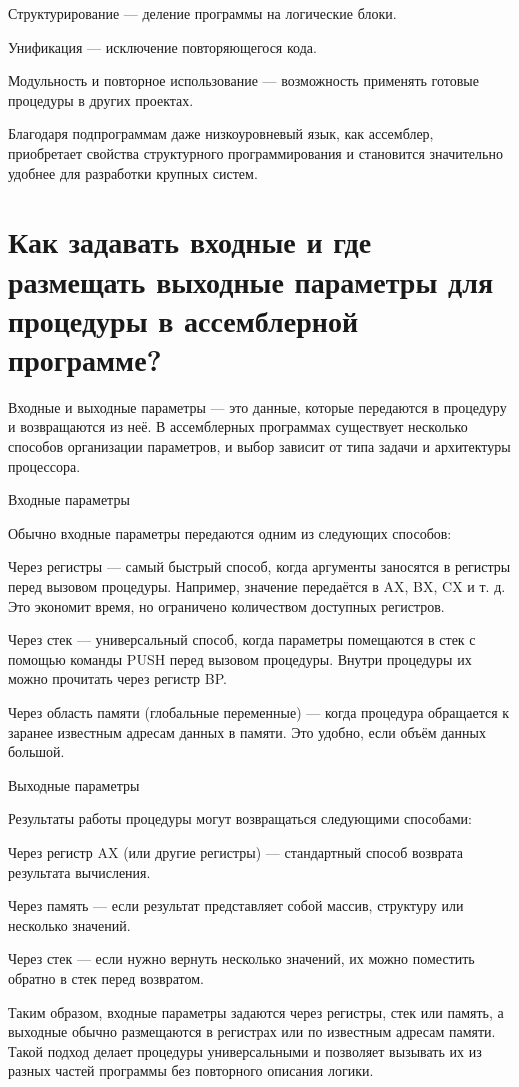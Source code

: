Структурирование — деление программы на логические блоки.

Унификация — исключение повторяющегося кода.

Модульность и повторное использование — возможность применять готовые процедуры в других проектах.

Благодаря подпрограммам даже низкоуровневый язык, как ассемблер, приобретает свойства структурного программирования и становится значительно удобнее для разработки крупных систем.

\section{Как задавать входные и где размещать выходные параметры для процедуры в ассемблерной программе?}

Входные и выходные параметры — это данные, которые передаются в процедуру и возвращаются из неё. В ассемблерных программах существует несколько способов организации параметров, и выбор зависит от типа задачи и архитектуры процессора.

Входные параметры

Обычно входные параметры передаются одним из следующих способов:

Через регистры — самый быстрый способ, когда аргументы заносятся в регистры перед вызовом процедуры. Например, значение передаётся в AX, BX, CX и т. д. Это экономит время, но ограничено количеством доступных регистров.

Через стек — универсальный способ, когда параметры помещаются в стек с помощью команды PUSH перед вызовом процедуры. Внутри процедуры их можно прочитать через регистр BP.

Через область памяти (глобальные переменные) — когда процедура обращается к заранее известным адресам данных в памяти. Это удобно, если объём данных большой.

Выходные параметры

Результаты работы процедуры могут возвращаться следующими способами:

Через регистр AX (или другие регистры) — стандартный способ возврата результата вычисления.

Через память — если результат представляет собой массив, структуру или несколько значений.

Через стек — если нужно вернуть несколько значений, их можно поместить обратно в стек перед возвратом.

Таким образом, входные параметры задаются через регистры, стек или память, а выходные обычно размещаются в регистрах или по известным адресам памяти. Такой подход делает процедуры универсальными и позволяет вызывать их из разных частей программы без повторного описания логики.

